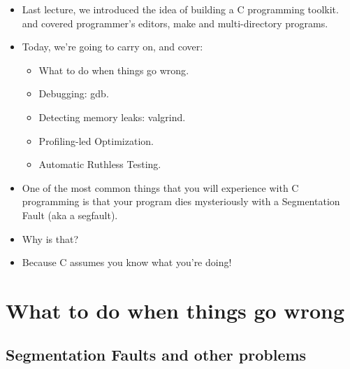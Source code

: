 \documentclass[handout]{beamer}
\newcommand{\pitem}{\pause \item}
\begin{document}
\begin{frame}[fragile]
  \begin{itemize}
    \item
      Last lecture, we introduced the idea of building a
      \alert{C programming toolkit}.
      and covered programmer's editors, make and multi-directory programs.

    \pitem
      Today, we're going to carry on, and cover:
      \begin{itemize}
      \item
        \alert{What to do when things go wrong}.
      \item
        \alert{Debugging: gdb}.
      \pitem
        \alert{Detecting memory leaks: valgrind}.
      \pitem
        \alert{Profiling-led Optimization}.
      \pitem
        \alert{Automatic Ruthless Testing}.
    \end{itemize}


    \pitem
    One of the most common things that you will experience with C programming
    is that your program dies mysteriously with a \alert{Segmentation Fault} (aka a \alert{segfault}).
    
    \item
    Why is that?

    \pitem
    \alert{Because C assumes you know what you're doing}!

  \end{itemize}
\end{frame}

\section{What to do when things go wrong}
\subsection{Segmentation Faults and other problems}
\end{document}
